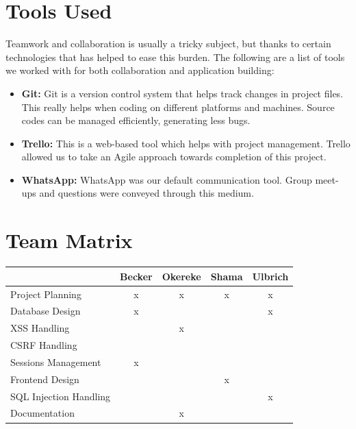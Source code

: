 \documentclass[12pt,a4paper]{article}
\begin{document}
\begin{flushleft}
	
		
	\section{Tools Used}
	Teamwork and collaboration is usually a tricky subject, but thanks to certain technologies that has helped to ease this burden. The following are a list of tools we worked with for both collaboration and application building:
	\begin{itemize}
		\item \textbf{Git:} Git is a version control system that helps track changes in project files. This really helps when coding on different platforms and machines. Source codes can be managed efficiently, generating less bugs.
		
		\item \textbf{Trello:} This is a web-based tool which helps with project management. Trello allowed us to take an Agile approach towards completion of this project.
		
		\item \textbf{WhatsApp:} WhatsApp was our default communication tool. Group meet-ups and questions were conveyed through this medium.
			
	\end{itemize}
	
	
	\section {Team Matrix}
	\begin{tabular}{|l|c|c|c|c|}
		\hline
		 & Becker & Okereke & Shama & Ulbrich \\ \hline
		 Project Planning & x & x & x & x \\ \hline
		 Database Design & x &  &  & x \\ \hline
		 XSS Handling &  & x &  &  \\ \hline
		 CSRF Handling &  &  &  &  \\ \hline
		 Sessions Management & x &  &  &  \\ \hline
		 Frontend Design &  &  & x &  \\ \hline
		 SQL Injection Handling &  &  &  & x \\ \hline
		 Documentation &  & x &  &  \\ \hline
	\end{tabular}
	

\end{flushleft}
\end{document}
